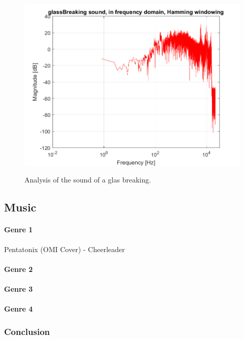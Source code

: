 \begin{figure}[htb]
	{\includegraphics[width=0.45\linewidth]{code/glassBreaking_figure5.png}}
	\caption{Analysis of the sound of a glas breaking.}\label{fig:glassBreaking}
\end{figure}


\subsection{Music}

\paragraph{Genre 1}
Pentatonix (OMI Cover) - Cheerleader

\paragraph{Genre 2}


\paragraph{Genre 3}

\paragraph{Genre 4}

\subsubsection{Conclusion}


